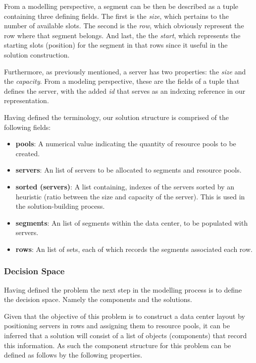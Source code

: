 From a modelling perspective, a segment can be then be described as a tuple
containing three defining fields. The first is the \textit{size}, which pertains
to the number of available slots. The second is the \textit{row}, which
obviously represent the row where that segment belongs. And last, the the
\textit{start}, which represents the starting slots (position) for the segment
in that rows since it useful in the solution construction.

Furthermore, as previously mentioned, a server has two properties: the
\textit{size} and the \textit{capacity}. From a modeling perspective, these are
the fields of a tuple that defines the server, with the added \textit{id} that
serves as an indexing reference in our representation.

Having defined the terminology, our solution structure is comprised of the
following fields:

\begin{itemize} \item \textbf{pools}: A numerical value indicating the quantity
        of resource pools to be created. \item \textbf{servers}: An list of servers to
        be allocated to segments and resource pools. \item \textbf{sorted (servers)}: A
        list containing, indexes of the servers sorted by an heuristic (ratio between
        the size and capacity of the server). This is used in the solution-building
        process. \item \textbf{segments}: An list of segments within the data center, to
        be populated with servers. \item \textbf{rows}: An list of sets, each of which
        records the segments associated each row. \end{itemize}

\subsubsection{Decision Space} \label{section:data-center-decision-space}

Having defined the problem the next step in the modelling process is to define
the decision space. Namely the components and the solutions.

Given that the objective of this problem is to construct a data center layout
by positioning servers in rows and assigning them to resource pools, it can be
inferred that a solution will consist of a list of objects (components) that
record this information. As such the component structure for this problem can be
defined as follows by the following properties.

